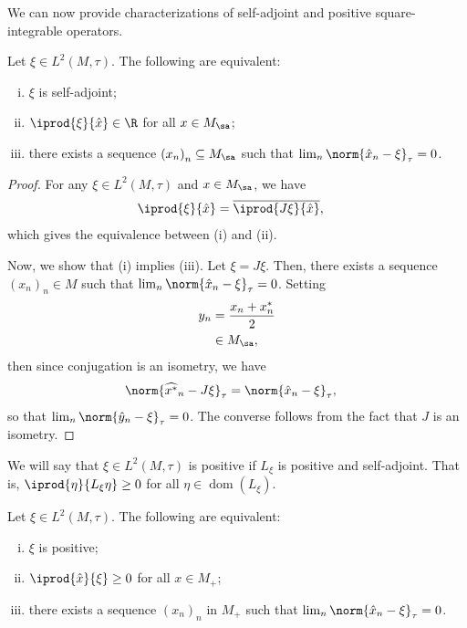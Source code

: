 \documentclass[10pt]{mypackage}
\begin{document}
We can now provide characterizations of self-adjoint and positive square-integrable operators.
\begin{proposition}
  Let $\xi\in L^2\left( M,\tau \right)$. The following are equivalent:
  \begin{enumerate}[(i)]
    \item $\xi$ is self-adjoint;
    \item $ \iprod{\xi}{\hat{x}}\in \R $ for all $x\in M_{\sa}$;
    \item there exists a sequence $\left( x_n \right)_n\subseteq M_{\sa}$ such that $\lim_{n}\norm{\hat{x}_n-\xi}_{\tau} = 0$.
  \end{enumerate}
\end{proposition}
\begin{proof}
  For any $\xi\in L^2\left( M,\tau \right)$ and $x\in M_{\sa}$, we have
  \begin{align*}
    \iprod{\xi}{\hat{x}} &= \overline{ \iprod{J\xi}{\hat{x}} },
  \end{align*}
  which gives the equivalence between (i) and (ii).

  Now, we show that (i) implies (iii). Let $\xi = J\xi$. Then, there exists a sequence $\left( x_n \right)_n\in M$ such that $\lim_{n}\norm{\hat{x}_n-\xi}_{\tau} = 0$. Setting
  \begin{align*}
    y_n &= \frac{x_n + x_n^{\ast}}{2}\\
        &\in M_{\sa},
  \end{align*}
  then since conjugation is an isometry, we have
  \begin{align*}
    \norm{\widehat{x^{\ast}}_n-J\xi}_{\tau} &= \norm{\hat{x}_n-\xi}_{\tau},
  \end{align*}
  so that $\lim_{n}\norm{\hat{y}_n-\xi}_{\tau} = 0$. The converse follows from the fact that $J$ is an isometry.
\end{proof}
We will say that $\xi\in L^2\left( M,\tau \right)$ is positive if $L_{\xi}$ is positive and self-adjoint. That is, $ \iprod{\eta}{L_{\xi}\eta} \geq 0 $ for all $\eta\in \operatorname{dom}\left( L_{\xi} \right)$.
\begin{proposition}
  Let $\xi\in L^2\left( M,\tau \right)$. The following are equivalent:
  \begin{enumerate}[(i)]
    \item $\xi$ is positive;
    \item $ \iprod{\hat{x}}{\xi} \geq 0 $ for all $x\in M_{+}$;
    \item there exists a sequence $\left( x_n \right)_n$ in $M_{+}$ such that $\lim_{n}\norm{\hat{x}_n-\xi}_{\tau} = 0$.
  \end{enumerate}
\end{proposition}
\end{document}
